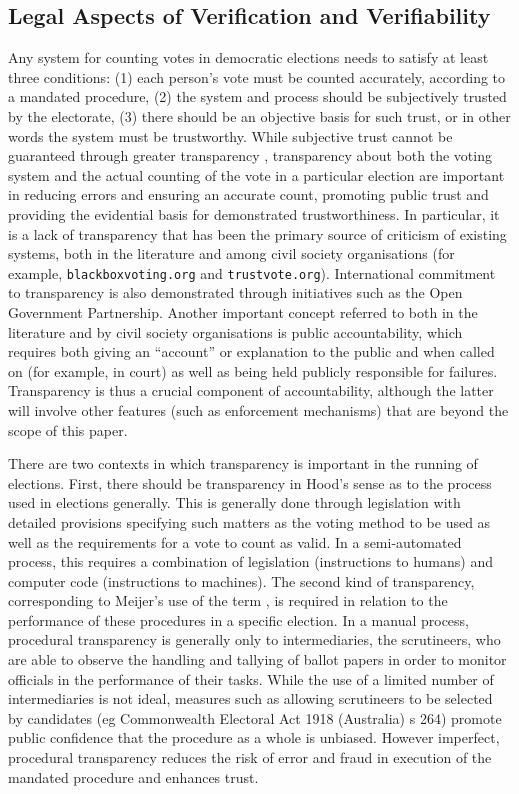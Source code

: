    
\subsection{Legal Aspects of Verification and Verifiability}
Any system for counting votes in democratic elections needs to
satisfy at least three conditions: (1) each person's vote must be
counted accurately, according to a mandated procedure, (2) the
system and process should be subjectively trusted by the electorate,
(3) there should be an objective basis for such trust, or in other
words the system must be trustworthy. While subjective trust cannot
be guaranteed through greater transparency \cite{ONeill:2002:QT}, transparency about
both the voting system and the actual counting of the vote in a
particular election are important in reducing errors and ensuring an
accurate count, promoting public trust and providing the evidential
basis for demonstrated trustworthiness. In particular, it is a lack
of transparency that has been the primary source of criticism of
existing systems, both in the literature
\cite{Carrier:2012:VCT,Conway:2017:ANS} and among civil
society organisations \cite{Vogl:2012:WWC} (for example,
\texttt{blackboxvoting.org} and
\texttt{trustvote.org}). International commitment to transparency is also
demonstrated through initiatives such as the Open Government
Partnership. Another important concept referred to both in the
literature and by civil society organisations is public
accountability, which requires both giving an “account” or
explanation to the public and when called on (for example, in court)
as well as being held publicly responsible for failures.
Transparency is thus a crucial component of accountability, although
the latter will involve other features (such as enforcement
mechanisms) that are beyond the scope of this paper. 

There are two contexts in which transparency is important in the
running of elections. First, there should be transparency in Hood's
sense \cite{Hood:2001:T} as to the process used in elections generally. This is
generally done through legislation with detailed provisions
specifying such matters as the voting method to be used 
 as well as the requirements for a vote to count as valid.
In a semi-automated process, this requires a combination of
legislation (instructions to humans) and computer code (instructions
to machines). The second kind of transparency, corresponding to
Meijer’s use of the term \cite{Meijer:2014:T}, is required in relation to the
performance of these procedures in a specific election. In a manual
process, procedural transparency is generally only to
intermediaries, the scrutineers, who are able to observe the
handling and tallying of ballot papers in order to monitor officials
in the performance of their tasks. While the use of a limited number
of intermediaries is not ideal, measures such as allowing
scrutineers to be selected by candidates (eg Commonwealth Electoral
Act 1918 (Australia) s 264) promote public confidence that the
procedure as a whole is unbiased. However imperfect, procedural
transparency reduces the risk of error and fraud in execution of the
mandated procedure and enhances trust. 

